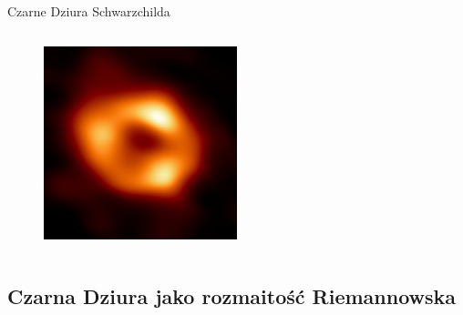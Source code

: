 \documentclass[polish, 9pt, xcolor=table, hyperref={pdfpagemode=FullScreen}]{beamer}
\begin{document}
\begin{frame}{Czarne Dziura Schwarzchilda}
\begin{columns}
\begin{column}{0.5\textwidth}
\begin{figure}
\centering
\includegraphics[width=0.5\textwidth]{ilustracje/zakazany_donut.jpg}
\end{figure}
\end{column}
\end{columns}
\end{frame}


\subsection{Czarna Dziura jako rozmaitość Riemannowska}
\end{document}

